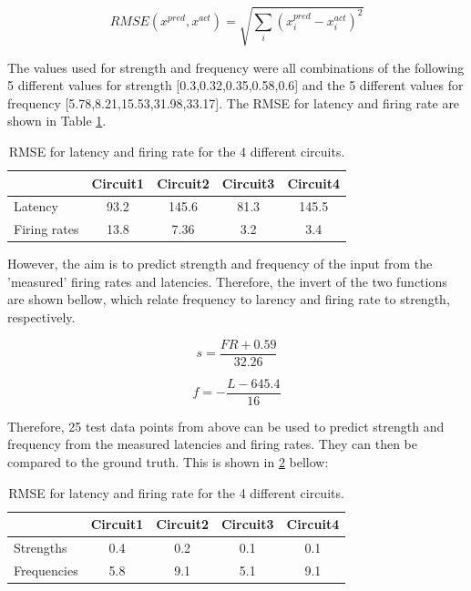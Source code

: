 \documentclass[11pt]{report}
\begin{document}
\[
 RMSE(x^{pred},x^{act})=\sqrt { \sum_i (x^{pred}_i - x^{act}_i)^2}
\]

The values used for strength and frequency were all combinations of the following 5 different values for strength [0.3,0.32,0.35,0.58,0.6] and the 5 different values for frequency [5.78,8.21,15.53,31.98,33.17]. The RMSE for latency and firing rate are shown in Table \ref{tab:rmse}.

\begin{table}[!h]
\centering
\caption{RMSE for latency and firing rate for the 4 different circuits.}
\begin{tabular}{lcccc}
\toprule
&Circuit1&Circuit2&Circuit3&Circuit4\\
\midrule
Latency&93.2&145.6&81.3&145.5\\
Firing rates&13.8&7.36&3.2&3.4\\
\bottomrule
\end{tabular}
\label{tab:rmse}
\end{table}

However, the aim is to predict strength and frequency of the input from the 'measured' firing rates and latencies. Therefore, the invert of the two functions are shown bellow, which relate frequency to larency and firing rate to strength, respectively.

\[
s = \frac{FR+0.59}{32.26}
\]

\[
f = -\frac{L-645.4}{16}
\]

Therefore, 25 test data points from above can be used to predict strength and frequency from the measured latencies and firing rates. They can then be compared to the ground truth. This is shown in \ref{tab:rmse-inverse} bellow:

\begin{table}[!h]
\centering
\caption{RMSE for latency and firing rate for the 4 different circuits.}
\begin{tabular}{lcccc}
\toprule
&Circuit1&Circuit2&Circuit3&Circuit4\\
\midrule
Strengths&0.4&0.2&0.1&0.1\\
Frequencies&5.8&9.1&5.1&9.1\\
\bottomrule
\end{tabular}
\label{tab:rmse-inverse}
\end{table}
\end{document}
